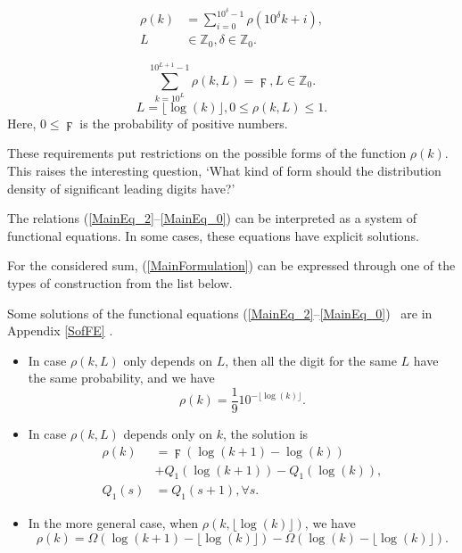 \documentclass[titlepage,fleqn]{article}%
\providecommand{\U}[1]{\protect\rule{.1in}{.1in}}
\begin{document}
\begin{align}
\rho(k)  &  =%
{\displaystyle\sum\limits_{i=0}^{10^{\delta}-1}}
\rho(10^{\delta}k+i),\label{MainEq_2}\\
L  &  \in%
\mathbb{Z}
_{0},\delta\in%
\mathbb{Z}
_{0}.\nonumber
\end{align}
%

\begin{equation}%
{\displaystyle\sum\limits_{k=10^{L}}^{10^{L+1}-1}}
\rho(k,L)=\digamma,L\in%
\mathbb{Z}
_{0}. \label{MainEq_0}%
\end{equation}%
\[
L=\lfloor\log(k)\rfloor,0\leq\rho(k,L)\leq1.
\]
\noindent Here, $0\leq\digamma$ is the probability of positive numbers.

These requirements put restrictions on the possible forms of the function
$\rho(k)$. This raises the interesting question, `What kind of form should the
distribution density of significant leading digits have?'

The relations (\ref{MainEq_2}--\ref{MainEq_0}) can be interpreted as a system
of functional equations. In some cases, these equations have explicit solutions.

For the considered sum, (\ref{MainFormulation}) can be expressed through one
of the types of construction from the list below.

Some solutions of the functional equations (\ref{MainEq_2}--\ref{MainEq_0})
\ are in Appendix
\ref{SofFE}%
.

\begin{itemize}
\item In case $\rho(k,L)$ only depends on $L$, then all the digit for the same
$L$ have the same probability, and we have%
\begin{equation}
\rho(k)=\frac{1}{9}10^{-\lfloor\log(k)\rfloor}. \label{S1}%
\end{equation}


\item In case $\rho(k,L)$ depends only on $k$, the solution is%
\begin{align}
\rho(k)  &  =\digamma\left(  \log(k+1)-\log(k)\right) \label{S2}\\
&  +Q_{1}(\log(k+1))-Q_{1}(\log(k)),\nonumber\\
Q_{1}(s)  &  =Q_{1}(s+1),\forall s.\nonumber
\end{align}


\item In the more general case, when $\rho(k,\lfloor\log(k)\rfloor)$, we have%
\begin{equation}
\rho(k)=\Omega(\log(k+1)-\lfloor\log(k)\rfloor)-\Omega(\log(k)-\lfloor
\log(k)\rfloor). \label{S3}%
\end{equation}

\end{itemize}
\end{document}
